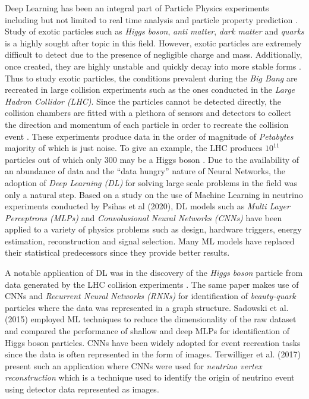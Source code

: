 Deep Learning has been an integral part of Particle Physics
experiments \cite{radovic2018machine, sadowski2015deep, de2019machine,
  psihas2020review, terwilliger2017vertex} including but not limited
to real time analysis and particle property prediction
\cite{radovic2018machine}. Study of exotic particles such as
\emph{Higgs boson}, \emph{anti matter}, \emph{dark matter} and
\emph{quarks} is a highly sought after topic in this field. However,
exotic particles are extremely difficult to detect due to the presence
of negligible charge and mass. Additionally, once created, they are
highly unstable and quickly decay into more stable forms
\cite{sadowski2015deep}. Thus to study exotic particles, the
conditions prevalent during the \emph{Big Bang} are recreated in large
collision experiments such as the ones conducted in the \emph{Large
Hadron Collidor (LHC)}. Since the particles cannot be detected
directly, the collision chambers are fitted with a plethora of sensors
and detectors to collect the direction and momentum of each particle
in order to recreate the collision event \cite{sadowski2015deep}.
These experiments produce data in the order of magnitude of
\emph{Petabytes} majority of which is just noise. To give an example,
the LHC produces $10^{11}$ particles out of which only 300 may be a
Higgs boson \cite{sadowski2015deep}. Due to the availability of an
abundance of data and the ``data hungry'' nature of Neural Networks,
the adoption of \emph{Deep Learning (DL)} for solving large scale
problems in the field was only a natural step. Based on a study on the
use of Machine Learning in neutrino experiments conducted by Psihas et
al (2020), DL models such as \emph{Multi Layer Perceptrons (MLPs)} and
\emph{Convolusional Neural Networks (CNNs)} have been applied to a
variety of physics problems such as design, hardware triggers, energy
estimation, reconstruction and signal selection. Many ML models have
replaced their statistical predecessors since they provide better
results.

A notable application of DL was in the discovery of the \emph{Higgs
boson} particle from data generated by the LHC collision experiments
\cite{radovic2018machine}. The same paper makes use of CNNs and
\emph{Recurrent Neural Networks (RNNs)} for identification of
\emph{beauty-quark} particles where the data was represented in a
graph structure. Sadowski et al. (2015) employed ML techniques to
reduce the dimensionality of the raw dataset and compared the
performance of shallow and deep MLPs for identification of Higgs boson
particles. CNNs have been widely adopted for event recreation tasks
since the data is often represented in the form of images. Terwilliger
et al. (2017) present such an application where CNNs were used for
\emph{neutrino vertex reconstruction} which is a technique used to
identify the origin of neutrino event using detector data represented
as images.

